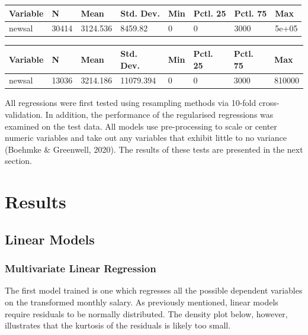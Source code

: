 \documentclass[11pt,preprint, authoryear]{elsarticle}
\let\origtable\table
\let\endorigtable\endtable
\renewenvironment{table}[1][2] {
    \expandafter\origtable\expandafter[H]
} {
    \endorigtable
}
\numberwithin{equation}{section}
\numberwithin{figure}{section}
\numberwithin{table}{section}
\begin{document}
\begin{table}

\caption{\label{tab:unnamed-chunk-5}Training Set}
\centering
\begin{tabular}[t]{llllllll}
\toprule
Variable & N & Mean & Std. Dev. & Min & Pctl. 25 & Pctl. 75 & Max\\
\midrule
newsal & 30414 & 3124.536 & 8459.82 & 0 & 0 & 3000 & 5e+05\\
\bottomrule
\end{tabular}
\end{table}

\begin{table}

\caption{\label{tab:unnamed-chunk-5}Testing Set}
\centering
\begin{tabular}[t]{llllllll}
\toprule
Variable & N & Mean & Std. Dev. & Min & Pctl. 25 & Pctl. 75 & Max\\
\midrule
newsal & 13036 & 3214.186 & 11079.394 & 0 & 0 & 3000 & 810000\\
\bottomrule
\end{tabular}
\end{table}

All regressions were first tested using resampling methods via 10-fold
cross-validation. In addition, the performance of the regularised
regressions was examined on the test data. All models use pre-processing
to scale or center numeric variables and take out any variables that
exhibit little to no variance (Boehmke \& Greenwell, 2020). The results
of these tests are presented in the next section.

\hypertarget{results}{%
\section{Results}\label{results}}

\hypertarget{linear-models}{%
\subsection{Linear Models}\label{linear-models}}

\hypertarget{multivariate-linear-regression}{%
\subsubsection{Multivariate Linear
Regression}\label{multivariate-linear-regression}}

The first model trained is one which regresses all the possible
dependent variables on the transformed monthly salary. As previously
mentioned, linear models require residuals to be normally distributed.
The density plot below, however, illustrates that the kurtosis of the
residuals is likely too small.
\end{document}

